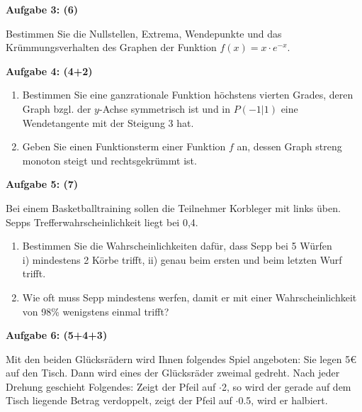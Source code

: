 \documentclass[a4paper,12pt]{article}
\newcommand{\Aufgabe}[1]{
  {
  \vspace*{0.5cm}
  \textsf{\textbf{Aufgabe #1}}
  \vspace*{0.2cm}
  
  }
}
\begin{document}
\Aufgabe{3: (6)} 
Bestimmen Sie die Nullstellen, Extrema, Wendepunkte und das Krümmungsverhalten des Graphen der Funktion ${f(x)=x\cdot e^{-x}}$.

\newpage
\Aufgabe{4: (4+2)} 
\begin{enumerate}[label={\alph*)}] 
  \item Bestimmen Sie eine ganzrationale Funktion höchstens vierten Grades, deren Graph bzgl. der $y$-Achse symmetrisch ist und in $P (-1|1)$ eine Wendetangente mit der Steigung 3 hat.
  \item Geben Sie einen Funktionsterm einer Funktion $f$ an, dessen Graph streng monoton steigt und rechtsgekrümmt ist.
\end{enumerate}




\Aufgabe{5: (7)} 
Bei einem Basketballtraining sollen die Teilnehmer Korbleger mit links üben. Sepps Trefferwahrscheinlichkeit liegt bei 0,4.
\begin{enumerate}[label={\alph*)}] 
  \item Bestimmen Sie die Wahrscheinlichkeiten dafür, dass Sepp bei 5 Würfen\\
    i) mindestens 2 Körbe trifft,  ii) genau beim ersten und beim letzten Wurf trifft.
  \item Wie oft muss Sepp mindestens werfen, damit er mit einer Wahrscheinlichkeit von 98\% wenigstens einmal trifft?
\end{enumerate}

\Aufgabe{6: (5+4+3)} 
Mit den beiden Glücksrädern wird Ihnen folgendes Spiel angeboten: Sie legen 5€ auf den Tisch. Dann wird eines der Glücksräder zweimal gedreht. Nach jeder Drehung geschieht Folgendes: Zeigt der Pfeil auf $\cdot$2, so wird der gerade auf dem Tisch liegende Betrag verdoppelt, zeigt der Pfeil auf $\cdot$0.5, wird er halbiert.
\end{document}
